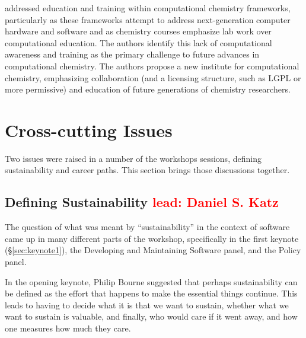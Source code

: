 \documentclass[11pt, oneside]{amsart}
\newcommand{\todo}[1]{{\color{blue}$\blacksquare$~\textsf{[TODO: #1]}}}
\newcommand{\note}[1]{ {\textcolor{red}    { #1 }}}
\begin{document}
\cite{Crawford_WSSSPE} addressed education and training within computational
chemistry frameworks, particularly as these frameworks attempt to address
next-generation computer hardware and software and as chemistry courses
emphasize lab work over computational education.  The authors identify this
lack of computational awareness and training as the primary challenge to future
advances in computational chemistry.  The authors propose a new institute for
computational chemistry, emphasizing collaboration (and a licensing structure,
such as LGPL or more permissive) and education of future generations of
chemistry researchers.

%
%
%

\section{Cross-cutting Issues} \label{sec:cross-cutting}

Two issues were raised in a number of the workshops sessions, defining sustainability and career paths.  This section brings those discussions together.

\subsection{Defining Sustainability \note{lead: Daniel S. Katz}}  \label{sec:defining-sustainability}

The question of what was meant by ``sustainability'' in the context of software
came up in many different parts of the workshop, specifically in the first
keynote (\S\ref{sec:keynote1}), the Developing and Maintaining Software panel,
and the Policy panel.

In the opening keynote, Philip Bourne suggested that perhaps sustainability can
be defined as the effort that happens to make the essential things continue.
This leads to having to decide what it is that we want to sustain, whether what
we want to sustain is valuable, and finally, who would care if it went away,
and how one measures how much they care.
\end{document}
